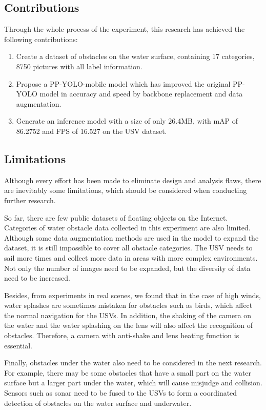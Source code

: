\documentclass[sensors,article,submit,moreauthors,pdftex]{Definitions/mdpi}
\begin{document}
\subsection{Contributions}
Through the whole process of the experiment, this research has achieved the following contributions:

\begin{enumerate}

\item Create a dataset of obstacles on the water surface, containing 17 categories, 8750 pictures with all label information.
\item Propose a PP-YOLO-mobile model which has improved the original PP-YOLO model in accuracy and speed by backbone replacement and data augmentation.
\item Generate an inference model with a size of only 26.4MB, with mAP of 86.2752 and FPS of 16.527 on the USV dataset.

\end{enumerate}

\subsection{Limitations}
Although every effort has been made to eliminate design and analysis flaws, there are inevitably some limitations, which should be considered when conducting further research.

So far, there are few public datasets of floating objects on the Internet. Categories of water obstacle data collected in this experiment are also limited. Although some data augmentation methods are used in the model to expand the dataset, it is still impossible to cover all obstacle categories. The USV needs to sail more times and collect more data in areas with more complex environments. Not only the number of images need to be expanded, but the diversity of data need to be increased.

Besides, from experiments in real scenes, we found that in the case of high winds, water splashes are sometimes mistaken for obstacles such as birds, which affect the normal navigation for the USVs. In addition, the shaking of the camera on the water and the water splashing on the lens will also affect the recognition of obstacles. Therefore, a camera with anti-shake and lens heating function is essential.

Finally, obstacles under the water also need to be considered in the next research. For example, there may be some obstacles that have a small part on the water surface but a larger part under the water, which will cause misjudge and collision. Sensors such as sonar need to be fused to the USVs to form a coordinated detection of obstacles on the water surface and underwater.
\end{document}
